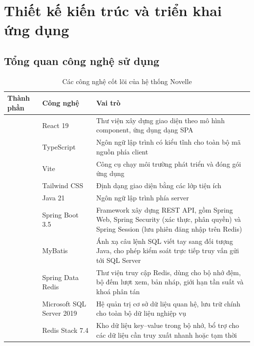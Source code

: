 \section{Thiết kế kiến trúc và triển khai ứng dụng}
\label{sec:architecture-implementation}

\subsection{Tổng quan công nghệ sử dụng}
\label{subsec:tech-stack}
\begin{table}[H]
\centering
\small
\renewcommand{\arraystretch}{1.3}
\begin{tabularx}{\textwidth}{|>{\raggedright\arraybackslash}p{2.6cm}|>{\raggedright\arraybackslash}p{4.0cm}|>{\raggedright\arraybackslash}X|}
\hline
\textbf{Thành phần} & \textbf{Công nghệ} & \textbf{Vai trò} \\ \hline
\multirow{4}{=}{Frontend}
 & React 19 & Thư viện xây dựng giao diện theo mô hình component, ứng dụng dạng SPA \\ \cline{2-3}
 & TypeScript & Ngôn ngữ lập trình có kiểu tĩnh cho toàn bộ mã nguồn phía client \\ \cline{2-3}
 & Vite & Công cụ chạy môi trường phát triển và đóng gói ứng dụng \\ \cline{2-3}
 & Tailwind CSS & Định dạng giao diện bằng các lớp tiện ích \\ \hline
\multirow{4}{=}{Backend}
 & Java 21 & Ngôn ngữ lập trình phía server \\ \cline{2-3}
 & Spring Boot 3.5 & Framework xây dựng REST API, gồm Spring Web, Spring Security (xác thực, phân quyền) và Spring Session (lưu phiên đăng nhập trên Redis) \\ \cline{2-3}
 & MyBatis & Ánh xạ câu lệnh SQL viết tay sang đối tượng Java, cho phép kiểm soát trực tiếp truy vấn gửi tới SQL Server \\ \cline{2-3}
 & Spring Data Redis & Thư viện truy cập Redis, dùng cho bộ nhớ đệm, bộ đếm lượt xem, bản nháp, giới hạn tần suất và khoá phân tán \\ \hline
\multirow{2}{=}{Cơ sở dữ liệu}
 & Microsoft SQL Server 2019 & Hệ quản trị cơ sở dữ liệu quan hệ, lưu trữ chính cho toàn bộ dữ liệu nghiệp vụ \\ \cline{2-3}
 & Redis Stack 7.4 & Kho dữ liệu key--value trong bộ nhớ, bổ trợ cho các dữ liệu cần truy xuất nhanh hoặc tạm thời \\ \hline
\end{tabularx}
\caption{Các công nghệ cốt lõi của hệ thống Novelle}
\label{tab:tech-stack}
\end{table}

